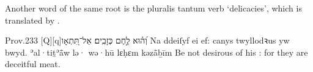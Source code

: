 
\begin{paper}
	Another word of the same root is the pluralis tantum verb  ‘delicacies’, which is translated by .
\end{paper}

\begin{example}{Prov.}{23}{3}{}{}
	\quoling
	{אַל־תִּ֭תְאָו‪[Q]‬‪[q]‬  וְ֝ה֗וּא לֶ֣חֶם כְּזָבִֽים׃}
	{Na ddeiſyf ei  ef: canys twyllodꝛus yw bwyd.}
	{ʾal·tiṯʾå̄w lə· wə·hū lɛḥɛm kəzå̄ḇīm}
	{Be not desirous of his : for they are deceitful meat.}
\end{example}
